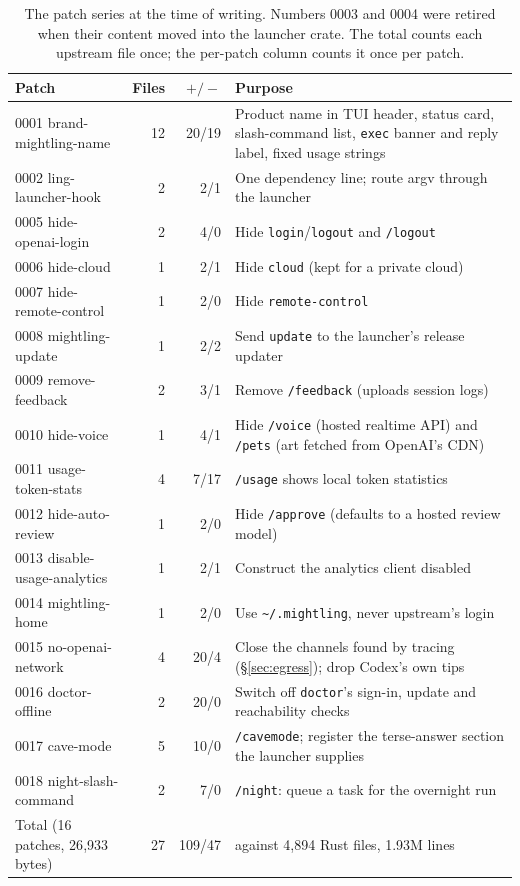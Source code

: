 \documentclass[11pt]{article}
\newcommand{\code}[1]{\texttt{#1}}
\begin{document}
\begin{table}[t]
\centering
\small
\begin{tabularx}{\linewidth}{@{}l r r X@{}}
\toprule
Patch & Files & $+/-$ & Purpose \\
\midrule
0001 brand-mightling-name & 12 & 20/19 & Product name in TUI header, status card, slash-command list, \code{exec} banner and reply label, fixed usage strings \\
0002 ling-launcher-hook & 2 & 2/1 & One dependency line; route argv through the launcher \\
0005 hide-openai-login & 2 & 4/0 & Hide \code{login}/\code{logout} and \code{/logout} \\
0006 hide-cloud & 1 & 2/1 & Hide \code{cloud} (kept for a private cloud) \\
0007 hide-remote-control & 1 & 2/0 & Hide \code{remote-control} \\
0008 mightling-update & 1 & 2/2 & Send \code{update} to the launcher's release updater \\
0009 remove-feedback & 2 & 3/1 & Remove \code{/feedback} (uploads session logs) \\
0010 hide-voice & 1 & 4/1 & Hide \code{/voice} (hosted realtime API) and \code{/pets} (art fetched from OpenAI's CDN) \\
0011 usage-token-stats & 4 & 7/17 & \code{/usage} shows local token statistics \\
0012 hide-auto-review & 1 & 2/0 & Hide \code{/approve} (defaults to a hosted review model) \\
0013 disable-usage-analytics & 1 & 2/1 & Construct the analytics client disabled \\
0014 mightling-home & 1 & 2/0 & Use \code{\textasciitilde/.mightling}, never upstream's login \\
0015 no-openai-network & 4 & 20/4 & Close the channels found by tracing (\S\ref{sec:egress}); drop Codex's own tips \\
0016 doctor-offline & 2 & 20/0 & Switch off \code{doctor}'s sign-in, update and reachability checks \\
0017 cave-mode & 5 & 10/0 & \code{/cavemode}; register the terse-answer section the launcher supplies \\
0018 night-slash-command & 2 & 7/0 & \code{/night}: queue a task for the overnight run \\
\midrule
Total (16 patches, 26{,}933 bytes) & 27 & 109/47 & against 4{,}894 Rust files, 1.93M lines \\
\bottomrule
\end{tabularx}
\caption{The patch series at the time of writing. Numbers 0003 and 0004 were retired when their
content moved into the launcher crate. The total counts each upstream file once; the per-patch
column counts it once per patch.}
\label{tab:patches}
\end{table}
\end{document}
